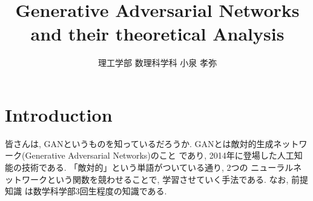 \newcommand{\Map}{\mathop{\mathrm{Map}}\nolimits}
\newcommand{\Hom}{\mathop{\mathrm{Hom}}\nolimits}
\newcommand{\End}{\mathop{\mathrm{End}}\nolimits}
\newcommand{\Aut}{\mathop{\mathrm{Aut}}\nolimits}
\newcommand{\Mor}{\mathop{\mathrm{Mor}}\nolimits}

\newcommand{\dip}{\displaystyle} %
\newcommand{\e}{\varepsilon} %
\newcommand{\dl}{\delta} %
\newcommand{\pphi}{\varphi} %
\newcommand{\ti}{\tilde} %
\newcommand{\pal}{\parallel} %
\newcommand{\op}{{\rm op}} %
\newcommand{\lcm}{\mathop{\mathrm{lcm}}\nolimits} %
\newcommand{\Probsp}{(\Omega, \F, \mathbb{P})} 
\newcommand{\argmax}{\mathop{\rm arg~max}\limits}
\newcommand{\argmin}{\mathop{\rm arg~min}\limits}












\def\inner<#1>{\langle #1 \rangle}








\title{Generative Adversarial Networks and their theoretical Analysis}
\author{理工学部 数理科学科 小泉 孝弥}
\date{}

\maketitle


\section{Introduction}
皆さんは, GANというものを知っているだろうか. GANとは敵対的生成ネットワーク(Generative Adversarial Networks)のこと
であり, 2014年に登場した人工知能の技術である. 「敵対的」という単語がついている通り, 2つの
ニューラルネットワークという関数を競わせることで, 学習させていく手法である. なお, 前提知識
は数学科学部3回生程度の知識である. 
